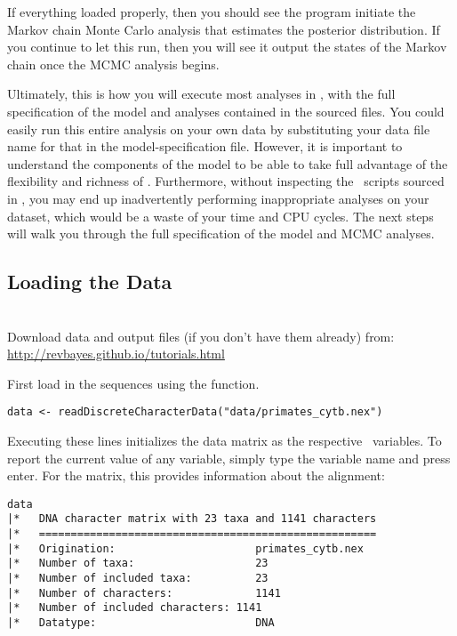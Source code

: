 If everything loaded properly, then you should see the program initiate the Markov chain Monte Carlo analysis that estimates the posterior distribution. 
If you continue to let this run, then you will see it output the states of the Markov chain once the MCMC analysis begins. 

Ultimately, this is how you will execute most analyses in \RevBayes, with the full specification of the model and analyses contained in the sourced files. 
You could easily run this entire analysis on your own data by substituting your data file name for that in the model-specification file. 
However, it is important to understand the components of the model to be able to take full advantage of the flexibility and richness of \RevBayes.
Furthermore, without inspecting the \Rev~scripts sourced in , you may end up inadvertently performing inappropriate analyses on your dataset, which would be a waste of your time and CPU cycles. 
The next steps will walk you through the full specification of the model and MCMC analyses. 

\bigskip

\subsection{Loading the Data}

\noindent \\ \impmark Download data and output files (if you don't have them already) from: \href{http://revbayes.github.io/tutorials.html}{http://revbayes.github.io/tutorials.html}


First load in the sequences using the  function. 
{\tt \begin{snugshade*}
\begin{lstlisting}
data <- readDiscreteCharacterData("data/primates_cytb.nex")
\end{lstlisting}
\end{snugshade*}}
Executing these lines initializes the data matrix as the respective \Rev~variables. 
To report the current value of any variable, simply type the variable name and press enter. For the  matrix, this provides information about the alignment:
{\tt \begin{snugshade*}
\begin{lstlisting}
data
|*   DNA character matrix with 23 taxa and 1141 characters
|*   =====================================================
|*   Origination:                      primates_cytb.nex
|*   Number of taxa:                   23
|*   Number of included taxa:          23
|*   Number of characters:             1141
|*   Number of included characters: 1141
|*   Datatype:                         DNA
\end{lstlisting}
\end{snugshade*}}


